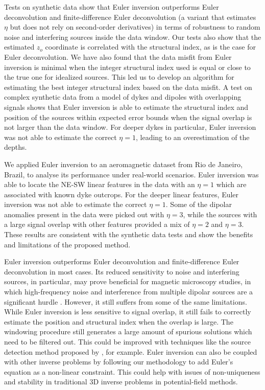 Tests on synthetic data show that Euler inversion outperforms Euler
deconvolution and finite-dif\-fer\-ence Euler deconvolution (a variant that
estimates $\eta$ but does not rely on second-order derivatives) in terms of
robustness to random noise and interfering sources inside the data window.
Our tests also show that the estimated $z_o$ coordinate is correlated with the
structural index, as is the case for Euler deconvolution.
We have also found that the data misfit from Euler inversion is minimal when
the integer structural index used is equal or close to the true one for
idealized sources.
This led us to develop an algorithm for estimating the best integer structural
index based on the data misfit.
A test on complex synthetic data from a model of dykes and dipoles with
overlapping signals shows that Euler inversion is able to estimate the
structural index and position of the sources within expected error bounds when
the signal overlap is not larger than the data window.
For deeper dykes in particular, Euler inversion was not able to estimate the
correct $\eta=1$, leading to an overestimation of the depths.

We applied Euler inversion to an aeromagnetic dataset from Rio de Janeiro,
Brazil, to analyse its performance under real-world scenarios.
Euler inversion was able to locate the NE-SW linear features in the data with
an $\eta=1$ which are associated with known dyke outcrops.
For the deeper linear features, Euler inversion was not able to estimate the
correct $\eta=1$.
Some of the dipolar anomalies present in the data were picked out with
$\eta=3$, while the sources with a large signal overlap with other features
provided a mix of $\eta=2$ and $\eta=3$.
These results are consistent with the synthetic data tests and show the
benefits and limitations of the proposed method.

Euler inversion outperforms Euler deconvolution and finite-difference Euler
deconvolution in most cases.
Its reduced sensitivity to noise and interfering sources, in particular,
may prove beneficial for magnetic microscopy studies, in which high-frequency
noise and interference from multiple dipolar sources are a significant hurdle
\citep{Souza-Junior2024}.
However, it still suffers from some of the same limitations.
While Euler inversion is less sensitive to signal overlap, it still fails to
correctly estimate the position and structural index when the overlap is large.
The windowing procedure still generates a large amount of spurious solutions
which need to be filtered out.
This could be improved with techniques like the source detection method
proposed by \citet{Castro2020}, for example.
Euler inversion can also be coupled with other inverse problems by following
our methodology to add Euler's equation as a non-linear constraint.
This could help with issues of non-uniqueness and stability in traditional 3D
inverse problems in potential-field methods.

